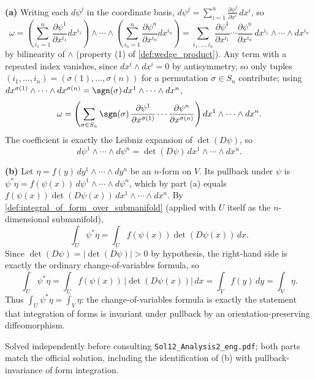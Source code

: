 \begin{exercisesolution}
\textbf{(a)} Writing each $d\psi^j$ in the coordinate basis, $d\psi^j = \sum_{i=1}^n
\frac{\partial\psi^j}{\partial x^i}\,dx^i$, so
\[\omega = \left(\sum_{i_1=1}^n \frac{\partial\psi^1}{\partial x^{i_1}}dx^{i_1}\right)\wedge
  \cdots\wedge\left(\sum_{i_n=1}^n \frac{\partial\psi^n}{\partial x^{i_n}}dx^{i_n}\right)
  = \sum_{i_1,\ldots,i_n} \frac{\partial\psi^1}{\partial x^{i_1}}\cdots
  \frac{\partial\psi^n}{\partial x^{i_n}}\,dx^{i_1}\wedge\cdots\wedge dx^{i_n}\]
by bilinearity of $\wedge$ (property (1) of \cref{def:wedge_product}). Any term with a
repeated index vanishes, since $dx^i\wedge dx^i=0$ by antisymmetry, so only tuples
$(i_1,\ldots,i_n) = (\sigma(1),\ldots,\sigma(n))$ for a permutation $\sigma \in S_n$
contribute; using $dx^{\sigma(1)}\wedge\cdots\wedge dx^{\sigma(n)} = \sgn(\sigma)\,dx^1\wedge
\cdots\wedge dx^n$,
\[\omega = \left(\sum_{\sigma\in S_n} \sgn(\sigma)\,\frac{\partial\psi^1}{\partial
  x^{\sigma(1)}}\cdots\frac{\partial\psi^n}{\partial x^{\sigma(n)}}\right) dx^1\wedge\cdots
  \wedge dx^n.\]
The coefficient is exactly the Leibniz expansion of $\det(D\psi)$, so
\[\boxed{\ d\psi^1\wedge\cdots\wedge d\psi^n = \det(D\psi)\,dx^1\wedge\cdots\wedge dx^n.\ }\]

\textbf{(b)} Let $\eta = f(y)\,dy^1\wedge\cdots\wedge dy^n$ be an $n$-form on $V$. Its
pullback under $\psi$ is $\psi^*\eta = f(\psi(x))\,d\psi^1\wedge\cdots\wedge d\psi^n$, which by
part (a) equals $f(\psi(x))\det(D\psi(x))\,dx^1\wedge\cdots\wedge dx^n$. By
\cref{def:integral_of_form_over_submanifold} (applied with $U$ itself as the $n$-dimensional
submanifold),
\[\int_U \psi^*\eta = \int_U f(\psi(x))\det(D\psi(x))\,dx.\]
Since $\det(D\psi) = \lvert\det(D\psi)\rvert>0$ by hypothesis, the right-hand side is exactly
the ordinary change-of-variables formula, so
\[\int_U \psi^*\eta = \int_U f(\psi(x))\,\lvert\det(D\psi(x))\rvert\,dx = \int_V f(y)\,dy
  = \int_V \eta.\]
Thus $\boxed{\int_U \psi^*\eta = \int_V \eta}$: the change-of-variables formula is exactly the
statement that integration of forms is invariant under pullback by an orientation-preserving
diffeomorphism.
\end{exercisesolution}

\begin{ainote}
Solved independently before consulting \texttt{Sol12\_Analysis2\_eng.pdf}; both parts match
the official solution, including the identification of (b) with pullback-invariance of form
integration.
\end{ainote}

